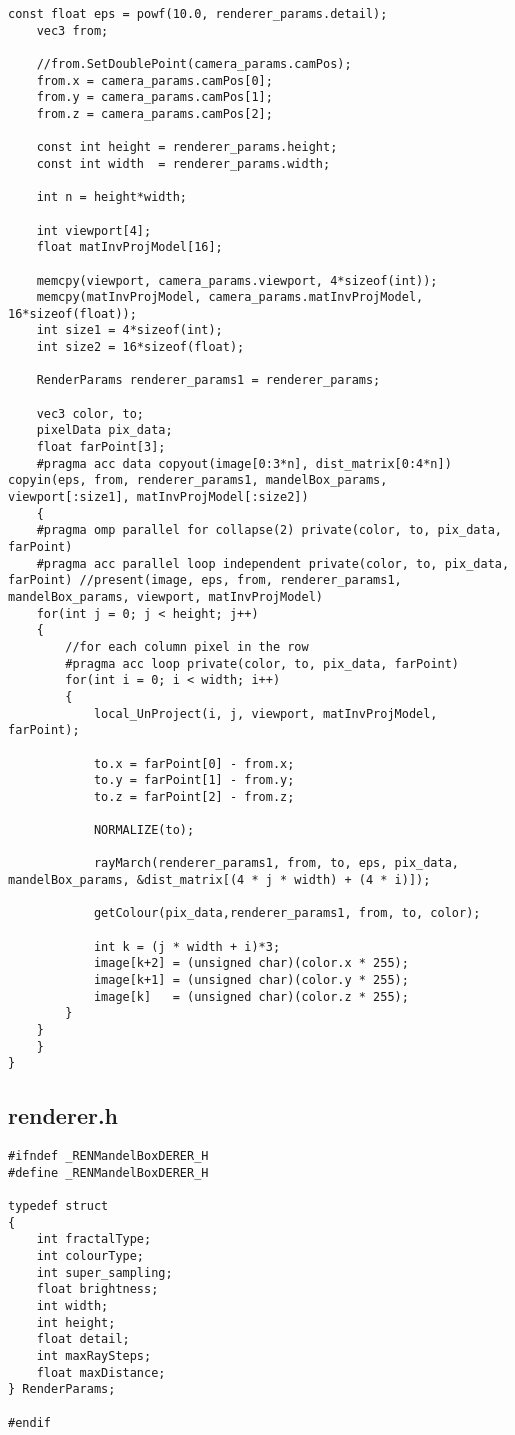 \documentclass[]{article}
\begin{document}
\begin{Verbatim}[fontsize= \footnotesize, tabsize=4]
	const float eps = powf(10.0, renderer_params.detail);
	vec3 from;

	//from.SetDoublePoint(camera_params.camPos);
	from.x = camera_params.camPos[0];
	from.y = camera_params.camPos[1];
	from.z = camera_params.camPos[2];

	const int height = renderer_params.height;
	const int width  = renderer_params.width;

	int n = height*width;

	int viewport[4];
	float matInvProjModel[16];

	memcpy(viewport, camera_params.viewport, 4*sizeof(int));
	memcpy(matInvProjModel, camera_params.matInvProjModel, 16*sizeof(float));
	int size1 = 4*sizeof(int);
	int size2 = 16*sizeof(float);

	RenderParams renderer_params1 = renderer_params;

	vec3 color, to;
	pixelData pix_data;
	float farPoint[3];
	#pragma acc data copyout(image[0:3*n], dist_matrix[0:4*n]) copyin(eps, from, renderer_params1, mandelBox_params, viewport[:size1], matInvProjModel[:size2])
	{
	#pragma omp parallel for collapse(2) private(color, to, pix_data, farPoint)
	#pragma acc parallel loop independent private(color, to, pix_data, farPoint) //present(image, eps, from, renderer_params1, mandelBox_params, viewport, matInvProjModel)
	for(int j = 0; j < height; j++)
	{
		//for each column pixel in the row
		#pragma acc loop private(color, to, pix_data, farPoint)
		for(int i = 0; i < width; i++)
		{
			local_UnProject(i, j, viewport, matInvProjModel, farPoint);

			to.x = farPoint[0] - from.x;
			to.y = farPoint[1] - from.y;
			to.z = farPoint[2] - from.z;

			NORMALIZE(to);

			rayMarch(renderer_params1, from, to, eps, pix_data, mandelBox_params, &dist_matrix[(4 * j * width) + (4 * i)]);

			getColour(pix_data,renderer_params1, from, to, color);

			int k = (j * width + i)*3;
			image[k+2] = (unsigned char)(color.x * 255);
			image[k+1] = (unsigned char)(color.y * 255);
			image[k]   = (unsigned char)(color.z * 255);
		}
	}
	}
}
\end{Verbatim}

\subsection{renderer.h}
\begin{Verbatim}[fontsize= \footnotesize, tabsize=4]
#ifndef _RENMandelBoxDERER_H
#define _RENMandelBoxDERER_H

typedef struct 
{
	int fractalType;
	int colourType;
	int super_sampling;
	float brightness;
	int width;
	int height;
	float detail;
	int maxRaySteps;
	float maxDistance;
} RenderParams;

#endif
\end{Verbatim}
\end{document}
